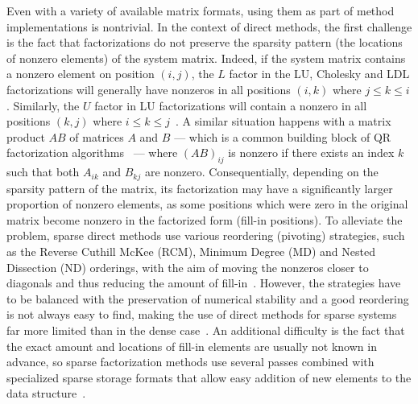 Even with a variety of available matrix formats, using them as part of method
implementations is nontrivial. In the context of direct methods, the first
challenge is the fact that factorizations do not preserve the sparsity pattern
(\ie the locations of nonzero elements) of the system matrix. Indeed, if the
system matrix contains a nonzero element on position $(i, j)$, the $L$
factor in the LU, Cholesky and LDL factorizations will generally have nonzeros
in all positions $(i, k)$ where $j \leq k \leq i$. Similarly, the $U$ factor in
LU factorizations will contain a nonzero in all positions $(k, j)$ where $i
\leq k \leq j$~\cite{duff}. A similar situation happens with a matrix product
$AB$ of matrices $A$ and $B$ --- which is a common building block of QR
factorization algorithms~\cite{demmel} --- where $(AB)_{ij}$ is nonzero if there
exists an index $k$ such that both $A_{ik}$ and $B_{kj}$ are nonzero.
Consequentially, depending on the sparsity pattern of the matrix, its
factorization may have a significantly larger proportion of nonzero elements, as
some positions which were zero in the original matrix become nonzero in the
factorized form (fill-in positions). To alleviate the problem, sparse direct
methods use various reordering (pivoting) strategies, such as the Reverse
Cuthill McKee (RCM), Minimum Degree (MD) and Nested Dissection (ND) orderings,
with the aim of moving the nonzeros closer to diagonals and thus reducing the
amount of fill-in~\cite{saad, duff}. However, the strategies have to be balanced
with the preservation of numerical stability and a good reordering is not always
easy to find, making the use of direct methods for sparse systems far more
limited than in the dense case~\cite{saad, duff}. An additional difficulty is
the fact that the exact amount and locations of fill-in elements are usually not
known in advance, so sparse factorization methods use several passes combined
with specialized sparse storage formats that allow easy addition of new elements
to the data structure~\cite{saad, duff}.

